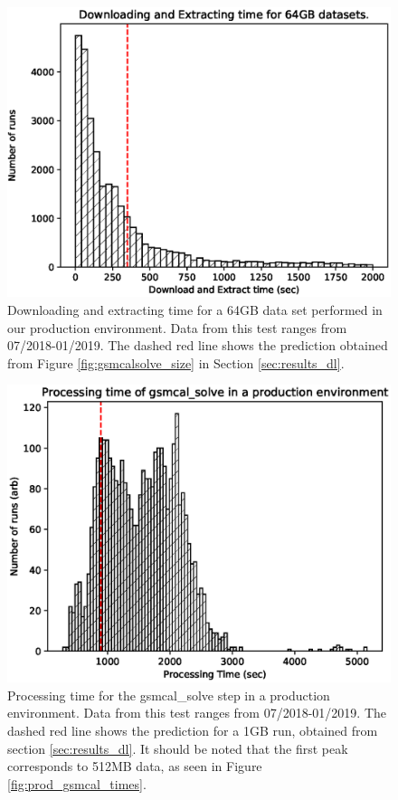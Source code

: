 \documentclass[preprint,5p]{elsarticle}
\begin{document}
\begin{figure}
    \includegraphics[width=0.95\linewidth]{figures/Production_64GB_2.eps}
      \caption{Downloading and extracting time for a 64GB data set performed in our production environment. Data from this test ranges from 07/2018-01/2019. The dashed red line shows the prediction obtained from Figure \ref{fig:gsmcalsolve_size} in Section \ref{sec:results_dl}. }
	\label{fig:prod_dl_64}
\end{figure}


\begin{figure}
    \includegraphics[width=0.95\linewidth]{figures/Production_gsmcal_1GB_2.eps}
      \caption{Processing time for the gsmcal\_solve step in a production environment. Data from this test ranges from 07/2018-01/2019. The dashed red line shows the prediction for a 1GB run, obtained from section \ref{sec:results_dl}. It should be noted that the first peak corresponds to 512MB data, as seen in Figure \ref{fig:prod_gsmcal_times}.}
	\label{fig:prod_gsmcal}
\end{figure}
\end{document}
